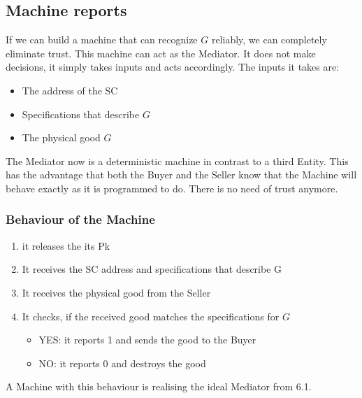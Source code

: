 \documentclass{cacthesis}
\begin{document}
\subsection{Machine reports}
If we can build a machine that can recognize $G$ reliably, we can completely eliminate trust. This machine can act as the Mediator. It does not make decisions, it simply takes inputs and acts accordingly.\newline
The inputs it takes are:
\begin{itemize}
    \item The address of the SC
    \item Specifications that describe $G$
    \item The physical good $G$
\end{itemize}

The Mediator now is a deterministic machine in contrast to a third Entity. This has the advantage that both the Buyer and the Seller know that the Machine will behave exactly as it is programmed to do. There is no need of trust anymore.\newline

\subsubsection{Behaviour of the Machine}
\begin{enumerate}
    \item it releases the its Pk  
    \item It receives the SC address and specifications that describe G
    \item It receives the physical good from the Seller
    \item It checks, if the received good matches the specifications for $G$
        \begin{itemize}
            \item YES: it reports 1 and sends the good to the Buyer
            \item NO: it reports 0 and destroys the good
        \end{itemize}
\end{enumerate}
A Machine with this behaviour is realising the ideal Mediator from 6.1. 
\end{document}
